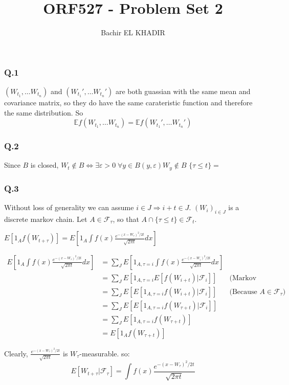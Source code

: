 \documentclass[12pt]{article}
\title{ORF527 - Problem Set 2}
\author{Bachir EL KHADIR }
\newcommand{\Q}[1]{\subsubsection*{Q.#1}}
\begin{document}
\maketitle
\Q{1}
$(W_{t_1}, \ldots W_{t_n})$ and $(W_{t_1}', \ldots W_{t_n}')$ are both guassian with the same mean and covariance matrix, so they do have the same carateristic function and therefore the same distribution.
So $$\mathbb E f(W_{t_1}, \ldots W_{t_n}) = \mathbb E f(W_{t_1}', \ldots W_{t_n}') $$

\Q{2}

Since $B$ is closed, $W_t \not \in B \iff \exists \varepsilon > 0 \; \forall y \in B(y, \varepsilon) W_{y} \not \in B$
$\{ \tau \le t\} = $

\Q{3}
Without loss of generality we can assume $i \in J \Rightarrow i+t \in J$.
$(W_i)_{i \in J}$ is a discrete markov chain.
Let $A \in \mathcal F_{\tau}$, so that $A \cap \{\tau \le t\} \in \mathcal F_t$.

$E[1_A f(W_{t + \tau})] = E[1_A \int f(x) \frac{e^{-(x-W_{\tau})^2/2t}}{\sqrt{2\pi t}} dx]$

\begin{align*}
  E[1_A \int f(x) \frac{e^{-(x-W_{\tau})^2/2t}}{\sqrt{2\pi t}} dx]
  &= \sum_J E[1_{A, \tau=i} \int f(x) \frac{e^{-(x-W_i)^2/2t}}{\sqrt{2\pi t}} dx]
  \\&= \sum_J E[1_{A, \tau=i} E[f(W_{i+t}) | \mathcal F_i]] &\text{(Markov Property)}
  \\&= \sum_J E[ E[ 1_{A, \tau=i}f(W_{i+t}) | \mathcal F_i]]&\text{(Because $A \in \mathcal F_{\tau}$)}
  \\&= \sum_J E[ E[ 1_{A, \tau=i} f(W_{\tau+t}) | \mathcal F_i]]
  \\&= \sum_J E[ 1_{A, \tau=i} f(W_{\tau+t})]
  \\&= E[ 1_A f(W_{\tau+t})]
\end{align*}

Clearly, $\frac{e^{-(x-W_{\tau})^2/2t}}{\sqrt{2\pi t}}$ is $W_{\tau}$-measurable. so:
$$E[W_{t+\tau} | \mathcal F_{\tau}] = \int f(x) \frac{e^{-(x-W_{\tau})^2/2t}}{\sqrt{2\pi t}}$$
\end{document}
